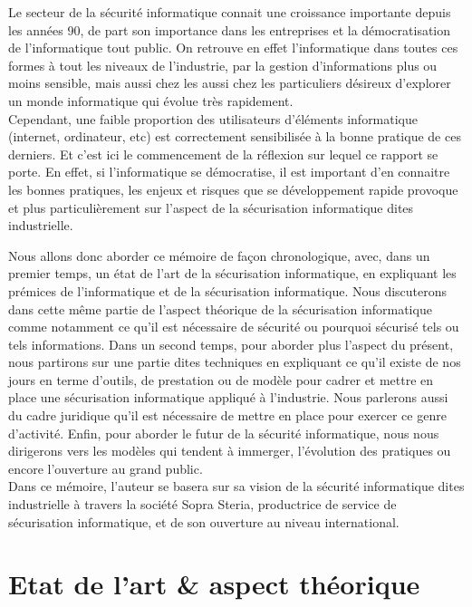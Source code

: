\documentclass[a4paper]{memoir}
\begin{document}
Le secteur de la sécurité informatique connait une croissance importante depuis les années 90, de part son importance dans les entreprises et la démocratisation de l'informatique tout public. On retrouve en effet l'informatique dans toutes ces formes à tout les niveaux de l'industrie, par la gestion d'informations plus ou moins sensible, mais aussi chez les aussi chez les particuliers désireux d'explorer un monde informatique qui évolue très rapidement.\\

Cependant, une faible proportion des utilisateurs d'éléments informatique (internet, ordinateur, etc) est correctement sensibilisée à la bonne pratique de ces derniers. Et c'est ici le commencement de la réflexion sur lequel ce rapport se porte. En effet, si l'informatique se démocratise, il est important d'en connaitre les bonnes pratiques, les enjeux et risques que se développement rapide provoque et plus particulièrement sur l'aspect de la sécurisation informatique dites industrielle.

Nous allons donc aborder ce mémoire de façon chronologique, avec, dans un premier temps, un état de l'art de la sécurisation informatique, en expliquant les prémices de l'informatique et de la sécurisation informatique. Nous discuterons dans cette même partie de l'aspect théorique de la sécurisation informatique comme notamment ce qu'il est nécessaire de sécurité ou pourquoi sécurisé tels ou tels informations.
Dans un second temps, pour aborder plus l'aspect du présent, nous partirons sur une partie dites techniques en expliquant ce qu'il existe de nos jours en terme d'outils, de prestation ou de modèle pour cadrer et mettre en place une sécurisation informatique appliqué à l'industrie. Nous parlerons aussi du cadre juridique qu'il est nécessaire de mettre en place pour exercer ce genre d'activité. Enfin, pour aborder le futur de la sécurité informatique, nous nous dirigerons vers les modèles qui tendent à immerger, l'évolution des pratiques ou encore l'ouverture au grand public.\\

Dans ce mémoire, l'auteur se basera sur sa vision de la sécurité informatique dites industrielle à travers la société Sopra Steria, productrice de service de sécurisation informatique, et de son ouverture au niveau international.



\part{Etat de l'art \& aspect théorique}
\end{document}
